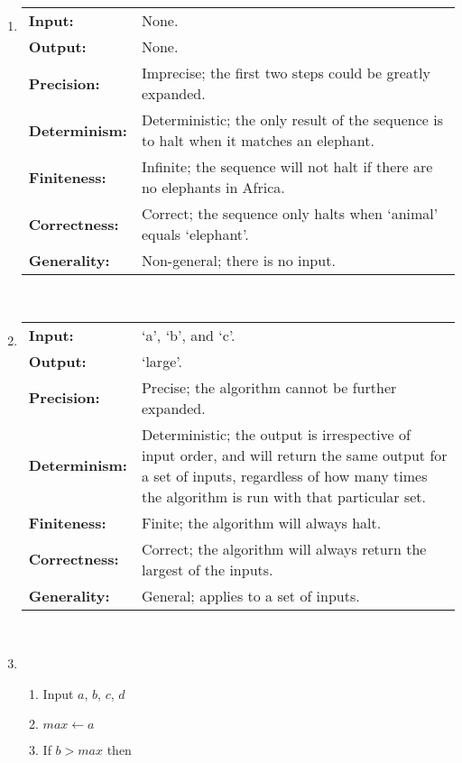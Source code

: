\begin{enumerate}[leftmargin=2cm,labelsep=.5cm,label=\bf\arabic*.]
\item 
\begin{tabu}[t]{l|p{.8\linewidth}}
  \textbf{Input:} & None.\\
  \textbf{Output:} & None.\\
  \textbf{Precision:} & Imprecise; the first two steps could be greatly expanded.\\
  \textbf{Determinism:} & Deterministic; the only result of the sequence is to halt when it matches an elephant.\\
  \textbf{Finiteness:} & Infinite; the sequence will not halt if there are no elephants in Africa.\\
  \textbf{Correctness:} & Correct; the sequence only halts when `animal' equals `elephant'.\\
  \textbf{Generality:} & Non-general; there is no input.\\
\end{tabu}\\[1cm]
\item
\begin{tabu}[t]{l|p{.8\linewidth}}
  \textbf{Input:} & `a', `b', and `c'.\\
  \textbf{Output:} & `large'.\\
  \textbf{Precision:} & Precise; the algorithm cannot be further expanded.\\
  \textbf{Determinism:} & Deterministic; the output is irrespective of input order, and will return the same output for a set of inputs, regardless of how many times the algorithm is run with that particular set.\\
  \textbf{Finiteness:} & Finite; the algorithm will always halt.\\
  \textbf{Correctness:} & Correct; the algorithm will always return the largest of the inputs.\\
  \textbf{Generality:} & General; applies to a set of inputs.\\
\end{tabu}\\[1cm]
\item
\begin{enumerate}[label=\arabic*.]
  \item Input $a$, $b$, $c$, $d$
  \item $max\leftarrow a$
  \item If $b > max$ then
  \begin{enumerate}[leftmargin=1cm,label*=\arabic*]

\end{enumerate}
\end{enumerate}
\end{enumerate}
